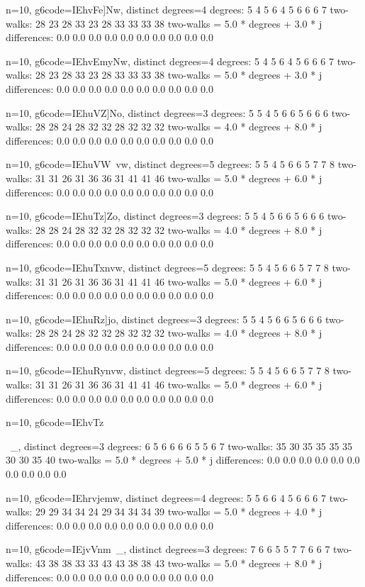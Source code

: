 {{{{{{{{{{{{{{{n=10, g6code=IEhvFe]Nw, distinct degrees=4
degrees: 5 4 5 6 4 5 6 6 6 7 
two-walks: 28 23 28 33 23 28 33 33 33 38 
two-walks = 5.0 * degrees + 3.0 * j
differences: 0.0 0.0 0.0 0.0 0.0 0.0 0.0 0.0 0.0 0.0 

n=10, g6code=IEhvEmyNw, distinct degrees=4
degrees: 5 4 5 6 4 5 6 6 6 7 
two-walks: 28 23 28 33 23 28 33 33 33 38 
two-walks = 5.0 * degrees + 3.0 * j
differences: 0.0 0.0 0.0 0.0 0.0 0.0 0.0 0.0 0.0 0.0 

n=10, g6code=IEhuVZ]No, distinct degrees=3
degrees: 5 5 4 5 6 6 5 6 6 6 
two-walks: 28 28 24 28 32 32 28 32 32 32 
two-walks = 4.0 * degrees + 8.0 * j
differences: 0.0 0.0 0.0 0.0 0.0 0.0 0.0 0.0 0.0 0.0 

n=10, g6code=IEhuVW~vw, distinct degrees=5
degrees: 5 5 4 5 6 6 5 7 7 8 
two-walks: 31 31 26 31 36 36 31 41 41 46 
two-walks = 5.0 * degrees + 6.0 * j
differences: 0.0 0.0 0.0 0.0 0.0 0.0 0.0 0.0 0.0 0.0 

n=10, g6code=IEhuTz]Zo, distinct degrees=3
degrees: 5 5 4 5 6 6 5 6 6 6 
two-walks: 28 28 24 28 32 32 28 32 32 32 
two-walks = 4.0 * degrees + 8.0 * j
differences: 0.0 0.0 0.0 0.0 0.0 0.0 0.0 0.0 0.0 0.0 

n=10, g6code=IEhuTxnvw, distinct degrees=5
degrees: 5 5 4 5 6 6 5 7 7 8 
two-walks: 31 31 26 31 36 36 31 41 41 46 
two-walks = 5.0 * degrees + 6.0 * j
differences: 0.0 0.0 0.0 0.0 0.0 0.0 0.0 0.0 0.0 0.0 

n=10, g6code=IEhuRz]jo, distinct degrees=3
degrees: 5 5 4 5 6 6 5 6 6 6 
two-walks: 28 28 24 28 32 32 28 32 32 32 
two-walks = 4.0 * degrees + 8.0 * j
differences: 0.0 0.0 0.0 0.0 0.0 0.0 0.0 0.0 0.0 0.0 

n=10, g6code=IEhuRynvw, distinct degrees=5
degrees: 5 5 4 5 6 6 5 7 7 8 
two-walks: 31 31 26 31 36 36 31 41 41 46 
two-walks = 5.0 * degrees + 6.0 * j
differences: 0.0 0.0 0.0 0.0 0.0 0.0 0.0 0.0 0.0 0.0 

n=10, g6code=IEhvTz{~_, distinct degrees=3
degrees: 6 5 6 6 6 6 5 5 6 7 
two-walks: 35 30 35 35 35 35 30 30 35 40 
two-walks = 5.0 * degrees + 5.0 * j
differences: 0.0 0.0 0.0 0.0 0.0 0.0 0.0 0.0 0.0 0.0 

n=10, g6code=IEhrvjemw, distinct degrees=4
degrees: 5 5 6 6 4 5 6 6 6 7 
two-walks: 29 29 34 34 24 29 34 34 34 39 
two-walks = 5.0 * degrees + 4.0 * j
differences: 0.0 0.0 0.0 0.0 0.0 0.0 0.0 0.0 0.0 0.0 

n=10, g6code=IEjvVnm~_, distinct degrees=3
degrees: 7 6 6 5 5 7 7 6 6 7 
two-walks: 43 38 38 33 33 43 43 38 38 43 
two-walks = 5.0 * degrees + 8.0 * j
differences: 0.0 0.0 0.0 0.0 0.0 0.0 0.0 0.0 0.0 0.0 

}}}}}}}}}}}}}}}}
